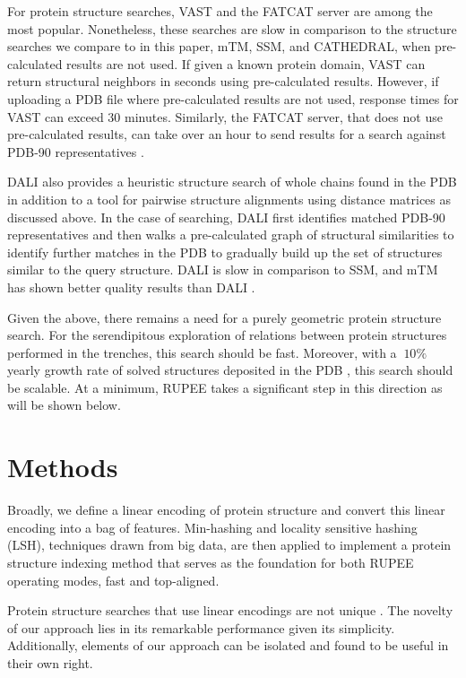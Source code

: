 \documentclass[10pt,letterpaper]{article}
\begin{document}
For protein structure searches, VAST \cite{Gilbrat1996} and the FATCAT server \cite{Ye2004} are among the most popular. 
Nonetheless, these searches are slow in comparison to the structure searches we compare to in this paper, mTM, SSM, and CATHEDRAL, when pre-calculated results are not used. 
If given a known protein domain, VAST can return structural neighbors in seconds using pre-calculated results. 
However, if uploading a PDB file where pre-calculated results are not used, response times for VAST can exceed 30 minutes. 
Similarly, the FATCAT server, that does not use pre-calculated results, can take over an hour to send results for a search against PDB-90 representatives \cite{Prlic2010}. 

DALI also provides a heuristic structure search \cite{Holm2010} of whole chains found in the PDB in addition to a tool for pairwise structure alignments using distance matrices as discussed above. 
In the case of searching, DALI first identifies matched PDB-90 representatives and then walks a pre-calculated graph of structural similarities to identify further matches in the PDB to gradually build up the set of structures similar to the query structure. 
DALI is slow in comparison to SSM, and mTM has shown better quality results than DALI \cite{Dong2018}.

Given the above, there remains a need for a purely geometric protein structure search.
For the serendipitous exploration of relations between protein structures performed in the trenches, this search should be fast. 
Moreover, with a $~10\%$ yearly growth rate of solved structures deposited in the PDB \cite{gkw1000}, this search should be scalable. 
At a minimum, RUPEE takes a significant step in this direction as will be shown below. 

\section*{Methods}

Broadly, we define a linear encoding of protein structure and convert this linear encoding into a bag of features. 
Min-hashing and locality sensitive hashing (LSH), techniques drawn from big data, are then applied to implement a protein structure indexing method that serves as the foundation for both RUPEE operating modes, fast and top-aligned. 

Protein structure searches that use linear encodings are not unique \cite{Carpentier2005,Daniluk2011,Ritchie2012}.
The novelty of our approach lies in its remarkable performance given its simplicity. 
Additionally, elements of our approach can be isolated and found to be useful in their own right. 
\end{document}
